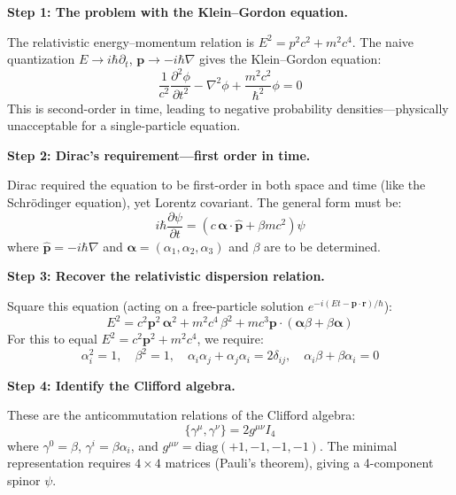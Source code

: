 \textbf{Step 1: The problem with the Klein--Gordon equation.}

The relativistic energy--momentum relation is $E^2 = p^2c^2 + m^2c^4$. The naive quantization $E \to i\hbar\partial_t$, $\mathbf{p} \to -i\hbar\nabla$ gives the Klein--Gordon equation:
\begin{equation}
\frac{1}{c^2}\frac{\partial^2 \phi}{\partial t^2} - \nabla^2 \phi + \frac{m^2c^2}{\hbar^2}\phi = 0
\end{equation}
This is second-order in time, leading to negative probability densities---physically unacceptable for a single-particle equation.

\textbf{Step 2: Dirac's requirement---first order in time.}

Dirac required the equation to be first-order in both space and time (like the Schr\"odinger equation), yet Lorentz covariant. The general form must be:
\begin{equation}
i\hbar\frac{\partial \psi}{\partial t} = \left(c\,\boldsymbol{\alpha} \cdot \hat{\mathbf{p}} + \beta m c^2\right)\psi
\end{equation}
where $\hat{\mathbf{p}} = -i\hbar\nabla$ and $\boldsymbol{\alpha} = (\alpha_1, \alpha_2, \alpha_3)$ and $\beta$ are to be determined.

\textbf{Step 3: Recover the relativistic dispersion relation.}

Square this equation (acting on a free-particle solution $e^{-i(Et - \mathbf{p}\cdot\mathbf{r})/\hbar}$):
\begin{equation}
E^2 = c^2\mathbf{p}^2\,\boldsymbol{\alpha}^2 + m^2c^4\,\beta^2 + mc^3\mathbf{p}\cdot(\boldsymbol{\alpha}\beta + \beta\boldsymbol{\alpha})
\end{equation}
For this to equal $E^2 = c^2\mathbf{p}^2 + m^2c^4$, we require:
\begin{equation}
\alpha_i^2 = 1,\quad \beta^2 = 1,\quad \alpha_i\alpha_j + \alpha_j\alpha_i = 2\delta_{ij},\quad \alpha_i\beta + \beta\alpha_i = 0
\end{equation}

\textbf{Step 4: Identify the Clifford algebra.}

These are the anticommutation relations of the Clifford algebra:
\begin{equation}
\{\gamma^\mu, \gamma^\nu\} = 2g^{\mu\nu}I_4
\end{equation}
where $\gamma^0 = \beta$, $\gamma^i = \beta\alpha_i$, and $g^{\mu\nu} = \text{diag}(+1,-1,-1,-1)$. The minimal representation requires $4\times 4$ matrices (Pauli's theorem), giving a 4-component spinor $\psi$.

